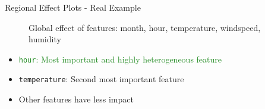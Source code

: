 \documentclass[11pt,compress,t,notes=noshow, aspectratio=169, xcolor=table,dvipsnames]{beamer}
\begin{document}
\begin{frame}{Regional Effect Plots - Real Example}
\begin{figure}
    \caption{Global effect of features: month, hour, temperature, windspeed, humidity}
    \label{fig:enter-label}
\end{figure}
\begin{itemize}
    \item<2> \textcolor{ForestGreen}{\texttt{hour}: Most important and highly heterogeneous feature}
    \item<2> \texttt{temperature}: Second most important feature
    \item<2> Other features have less impact
\end{itemize}
\end{frame}
\end{document}
